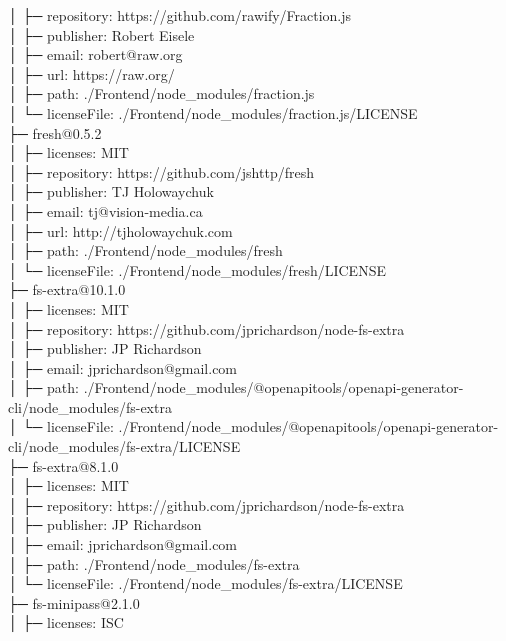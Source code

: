 \documentclass[
    paper=a4,
    twoside=false,
    parskip=half,
    listof=entryprefix,
    listof=totoc,
    index=totoc,
    bibliography=totoc,
    headsepline,
]{scrbook}
\begin{document}
    │  ├─ repository: https://github.com/rawify/Fraction.js\\
    │  ├─ publisher: Robert Eisele\\
    │  ├─ email: robert@raw.org\\
    │  ├─ url: https://raw.org/\\
    │  ├─ path: ./Frontend/node\_modules/fraction.js\\
    │  └─ licenseFile: ./Frontend/node\_modules/fraction.js/LICENSE\\
    ├─ fresh@0.5.2\\
    │  ├─ licenses: MIT\\
    │  ├─ repository: https://github.com/jshttp/fresh\\
    │  ├─ publisher: TJ Holowaychuk\\
    │  ├─ email: tj@vision-media.ca\\
    │  ├─ url: http://tjholowaychuk.com\\
    │  ├─ path: ./Frontend/node\_modules/fresh\\
    │  └─ licenseFile: ./Frontend/node\_modules/fresh/LICENSE\\
    ├─ fs-extra@10.1.0\\
    │  ├─ licenses: MIT\\
    │  ├─ repository: https://github.com/jprichardson/node-fs-extra\\
    │  ├─ publisher: JP Richardson\\
    │  ├─ email: jprichardson@gmail.com\\
    │  ├─ path: ./Frontend/node\_modules/@openapitools/openapi-generator-cli/node\_modules/fs-extra\\
    │  └─ licenseFile: ./Frontend/node\_modules/@openapitools/openapi-generator-cli/node\_modules/fs-extra/LICENSE\\
    ├─ fs-extra@8.1.0\\
    │  ├─ licenses: MIT\\
    │  ├─ repository: https://github.com/jprichardson/node-fs-extra\\
    │  ├─ publisher: JP Richardson\\
    │  ├─ email: jprichardson@gmail.com\\
    │  ├─ path: ./Frontend/node\_modules/fs-extra\\
    │  └─ licenseFile: ./Frontend/node\_modules/fs-extra/LICENSE\\
    ├─ fs-minipass@2.1.0\\
    │  ├─ licenses: ISC\\
\end{document}
